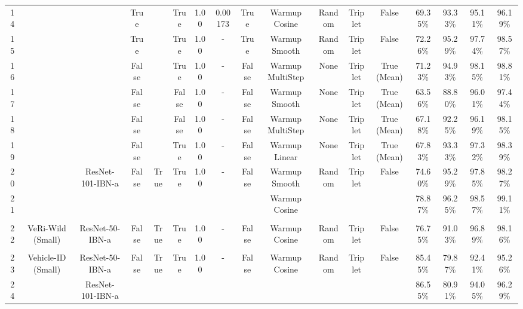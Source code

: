 \begin{table}
{\begin{tabular}{|c|c|c|c|c|c|c|c|c|c|c|c|c|c|c|c|c|}
        14 &  &  & True & & True & 1.00 & 0.00173 & True & Warmup Cosine & Random & Triplet & False & 69.35\% & 93.33\% & 95.11\% & 96.19\% \\
        15 &  &  & True & & True & 1.00 & - & True & Warmup Smooth & Random & Triplet & False & 72.26\% & 95.29\% & 97.74\% & 98.57\% \\
        16 &  &  & False & & True & 1.00 & - & False & Warmup MultiStep & None & Triplet & True (Mean) & 71.23\% & 94.93\% & 98.15\% & 98.81\% \\
        17 &  &  & False & & False & 1.00 & - & False & Warmup Smooth & None & Triplet & True (Mean) & 63.56\% & 88.80\% & 96.01\% & 97.44\% \\
        18 &  &  & False & & False & 1.00 & - & False & Warmup MultiStep & None & Triplet & True (Mean) & 67.18\% & 92.25\% & 96.19\% & 98.15\% \\
        19 &  &  & False & & True & 1.00 & - & False & Warmup Linear & None & Triplet & True (Mean) & 67.83\% & 93.33\% & 97.32\% & 98.39\% \\
        \cline{3-17}
        20 &  \multirow{2}{*}{} & \multirow{2}{*}{ResNet-101-IBN-a} & \multirow{2}{*}{False} & \multirow{2}{*}{True} & \multirow{2}{*}{True} & \multirow{2}{*}{1.00} & \multirow{2}{*}{-} & \multirow{2}{*}{False} & Warmup Smooth & \multirow{2}{*}{Random} & \multirow{2}{*}{Triplet} & \multirow{2}{*}{False} & 74.60\% & 95.29\% & 97.85\% & 98.27\% \\
        21 & & & & & & & & & Warmup Cosine & & & & 78.87\% & 96.25\% & 98.57\% & 99.11\% \\
        \hline
        \multicolumn{17}{c}{\rule{0pt}{4pt}} \\ %
        \hline
        22 & VeRi-Wild (Small) & ResNet-50-IBN-a & False & True & True & 1.00 & - & False & Warmup Cosine & Random & Triplet & False & 76.75\% & 91.03\% & 96.89\% & 98.16\% \\
        \hline
        \multicolumn{17}{c}{\rule{0pt}{4pt}} \\ %
        \hline
        23 & \multirow{2}{*}{Vehicle-ID (Small)} & ResNet-50-IBN-a & \multirow{2}{*}{False} & \multirow{2}{*}{True} & \multirow{2}{*}{True} & \multirow{2}{*}{1.00} & \multirow{2}{*}{-} & \multirow{2}{*}{False} & \multirow{2}{*}{Warmup Cosine} & \multirow{2}{*}{Random} & \multirow{2}{*}{Triplet} & \multirow{2}{*}{False} & 85.45\% & 79.87\% & 92.41\% & 95.26\% \\
        24 & & ResNet-101-IBN-a & & & & & & & & & & & 86.55\% & 80.91\% & 94.05\% & 96.29\% \\       

\end{tabular}}
\end{table}
